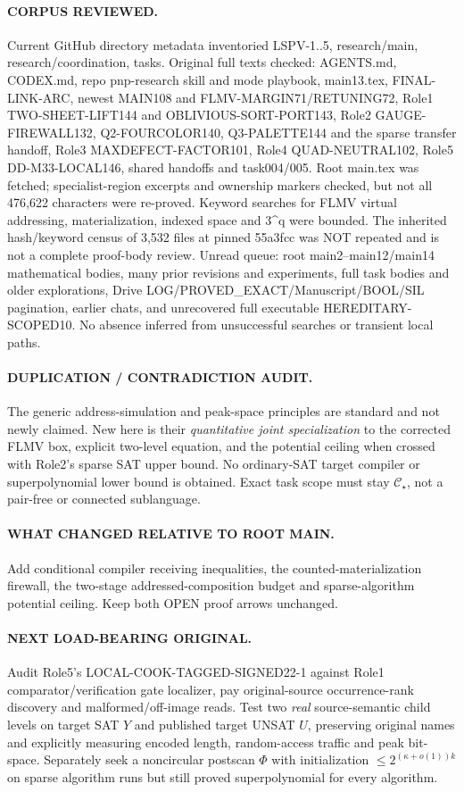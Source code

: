 \documentclass[11pt]{article}
\newcommand{\CS}{\mathcal C_\star}
\begin{document}
\paragraph{CORPUS REVIEWED.}
Current GitHub directory metadata inventoried LSPV-1..5,
research/main, research/coordination, tasks. Original full
texts checked: AGENTS.md, CODEX.md, repo pnp-research skill
and mode playbook, main13.tex, FINAL-LINK-ARC, newest MAIN108
and FLMV-MARGIN71/RETUNING72, Role1 TWO-SHEET-LIFT144 and
OBLIVIOUS-SORT-PORT143, Role2 GAUGE-FIREWALL132,
Q2-FOURCOLOR140, Q3-PALETTE144 and the sparse transfer
handoff, Role3 MAXDEFECT-FACTOR101, Role4 QUAD-NEUTRAL102,
Role5 DD-M33-LOCAL146, shared handoffs and task004/005.
Root main.tex was fetched; specialist-region excerpts and
ownership markers checked, but not all 476,622 characters
were re-proved. Keyword searches for FLMV virtual addressing,
materialization, indexed space and 3^q were bounded.
The inherited hash/keyword census of 3,532 files at pinned
55a3fcc was NOT repeated and is not a complete proof-body review.
Unread queue: root main2--main12/main14 mathematical bodies,
many prior revisions and experiments, full task bodies and
older explorations, Drive LOG/PROVED_EXACT/Manuscript/BOOL/SIL
pagination, earlier chats, and unrecovered full executable
HEREDITARY-SCOPED10. No absence inferred from unsuccessful
searches or transient local paths.
\paragraph{DUPLICATION / CONTRADICTION AUDIT.}
The generic address-simulation and peak-space principles are
standard and not newly claimed. New here is their
\emph{quantitative joint specialization} to the corrected
FLMV box, explicit two-level equation, and the potential
ceiling when crossed with Role2's sparse SAT upper bound.
No ordinary-SAT target compiler or superpolynomial
lower bound is obtained. Exact task scope must stay
$\CS$, not a pair-free or connected sublanguage.
\paragraph{WHAT CHANGED RELATIVE TO ROOT MAIN.}
Add conditional compiler receiving inequalities,
the counted-materialization firewall, the
two-stage addressed-composition budget and
sparse-algorithm potential ceiling. Keep both
OPEN proof arrows unchanged.
\paragraph{NEXT LOAD-BEARING ORIGINAL.}
Audit Role5's LOCAL-COOK-TAGGED-SIGNED22-1
against Role1 comparator/verification gate localizer,
pay original-source occurrence-rank discovery and
malformed/off-image reads. Test two \emph{real}
source-semantic child levels on target SAT $Y$ and
published target UNSAT $U$, preserving original names
and explicitly measuring encoded length, random-access
traffic and peak bit-space. Separately seek a
noncircular postscan $\Phi$ with initialization
$\le2^{(\kappa+o(1))k}$ on sparse algorithm runs
but still proved superpolynomial for every algorithm.
\end{document}
